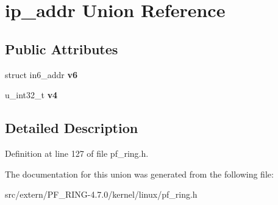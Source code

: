 \hypertarget{unionip__addr}{
\section{ip\_\-addr Union Reference}
\label{unionip__addr}
}
\subsection*{Public Attributes}
\begin{DoxyCompactItemize}
\item 
\hypertarget{unionip__addr_a945b25bf5a5d5e97b14442d7736e196f}{
struct in6\_\-addr {\bfseries v6}}
\label{unionip__addr_a945b25bf5a5d5e97b14442d7736e196f}

\item 
\hypertarget{unionip__addr_a0df54df4b8206e9dd4036cdf7116db2e}{
u\_\-int32\_\-t {\bfseries v4}}
\label{unionip__addr_a0df54df4b8206e9dd4036cdf7116db2e}

\end{DoxyCompactItemize}


\subsection{Detailed Description}


Definition at line 127 of file pf\_\-ring.h.



The documentation for this union was generated from the following file:\begin{DoxyCompactItemize}
\item 
src/extern/PF\_\-RING-\/4.7.0/kernel/linux/pf\_\-ring.h\end{DoxyCompactItemize}
